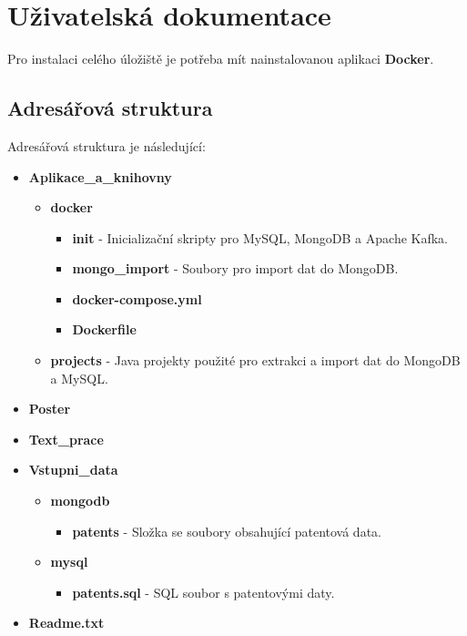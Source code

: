 \chapter{Uživatelská dokumentace}  \label{chap:uziv_doc}
Pro instalaci celého úložiště je potřeba mít nainstalovanou aplikaci \textbf{Docker}.

\section{Adresářová struktura}
Adresářová struktura je následující:
\begin{itemize}
\item \textbf{Aplikace\_a\_knihovny}
	\begin{itemize}
	\item \textbf{docker}
		\begin{itemize}
		\item \textbf{init} - Inicializační skripty pro MySQL, MongoDB a Apache Kafka.
		\item \textbf{mongo\_import} - Soubory pro import dat do MongoDB.
		\item \textbf{docker-compose.yml}
		\item \textbf{Dockerfile}
		\end{itemize}
	\item \textbf{projects} - Java projekty použité pro extrakci a import dat do MongoDB a MySQL.
	\end{itemize}
\item \textbf{Poster}
\item \textbf{Text\_prace}
\item \textbf{Vstupni\_data}
	\begin{itemize}
	\item \textbf{mongodb}
		\begin{itemize}
		\item \textbf{patents} - Složka se soubory obsahující patentová data.
		\end{itemize}
	\item \textbf{mysql}
		\begin{itemize}
		\item \textbf{patents.sql} - SQL soubor s patentovými daty.
		\end{itemize}
	\end{itemize}
\item \textbf{Readme.txt}
\end{itemize}
\newpage
